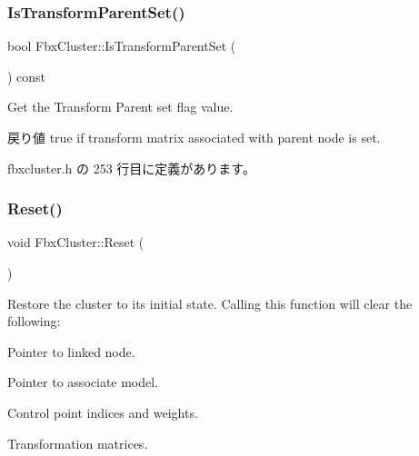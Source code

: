 \mbox{\label{class_fbx_cluster_a1a9904707814b3a1fea61f4c35152fa5}} 
\subsubsection{\texorpdfstring{Is\+Transform\+Parent\+Set()}{IsTransformParentSet()}}
{\footnotesize\ttfamily bool Fbx\+Cluster\+::\+Is\+Transform\+Parent\+Set (\begin{DoxyParamCaption}{ }\end{DoxyParamCaption}) const\hspace{0.3cm}{\ttfamily [inline]}}

Get the Transform Parent set flag value. \begin{DoxyReturn}{戻り値}
{\ttfamily true} if transform matrix associated with parent node is set. 
\end{DoxyReturn}


 fbxcluster.\+h の 253 行目に定義があります。

\mbox{\label{class_fbx_cluster_a6e12a1e6e2d6d8a05ddee9f280827cfc}} 
\subsubsection{\texorpdfstring{Reset()}{Reset()}}
{\footnotesize\ttfamily void Fbx\+Cluster\+::\+Reset (\begin{DoxyParamCaption}{ }\end{DoxyParamCaption})}

Restore the cluster to its initial state. Calling this function will clear the following\+: \begin{DoxyItemize}
\item Pointer to linked node. \item Pointer to associate model. \item Control point indices and weights. \item Transformation matrices. \end{DoxyItemize}
\mbox{\label{class_fbx_cluster_a561e81f78f469d7579879f0f27c9c6de}} 
